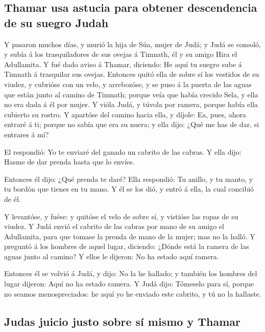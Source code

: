 \hypertarget{thamar-usa-astucia-para-obtener-descendencia-de-su-suegro-judah}{%
\subsection{Thamar usa astucia para obtener descendencia de su suegro
Judah}\label{thamar-usa-astucia-para-obtener-descendencia-de-su-suegro-judah}}

 Y pasaron muchos días, y murió la hija de Súa, mujer de
Judá; y Judá se consoló, y subía á los trasquiladores de sus ovejas á
Timnath, él y su amigo Hira el Adullamita.  Y fué dado
aviso á Thamar, diciendo: He aquí tu suegro sube á Timnath á trasquilar
sus ovejas.  Entonces quitó ella de sobre sí los vestidos
de su viudez, y cubrióse con un velo, y arrebozóse, y se puso á la
puerta de las aguas que están junto al camino de Timnath; porque veía
que había crecido Sela, y ella no era dada á él por mujer.
 Y vióla Judá, y túvola por ramera, porque había ella
cubierto su rostro.  Y apartóse del camino hacia ella, y
díjole: Ea, pues, ahora entraré á ti; porque no sabía que era su nuera;
y ella dijo: ¿Qué me has de dar, si entrares á mí?

 El respondió: Yo te enviaré del ganado un cabrito de las
cabras. Y ella dijo: Hasme de dar prenda hasta que lo envíes.

 Entonces él dijo: ¿Qué prenda te daré? Ella respondió:
Tu anillo, y tu manto, y tu bordón que tienes en tu mano. Y él se los
dió, y entró á ella, la cual concibió de él.

 Y levantóse, y fuése: y quitóse el velo de sobre sí, y
vistióse las ropas de su viudez.  Y Judá envió el cabrito
de las cabras por mano de su amigo el Adullamita, para que tomase la
prenda de mano de la mujer; mas no la halló.  Y preguntó
á los hombres de aquel lugar, diciendo: ¿Dónde está la ramera de las
aguas junto al camino? Y ellos le dijeron: No ha estado aquí ramera.

 Entonces él se volvió á Judá, y dijo: No la he hallado;
y también los hombres del lugar dijeron: Aquí no ha estado ramera.
 Y Judá dijo: Tómeselo para sí, porque no seamos
menospreciados: he aquí yo he enviado este cabrito, y tú no la hallaste.

\hypertarget{judas-juicio-justo-sobre-suxed-mismo-y-thamar}{%
\subsection{Judas juicio justo sobre sí mismo y
Thamar}\label{judas-juicio-justo-sobre-suxed-mismo-y-thamar}}

